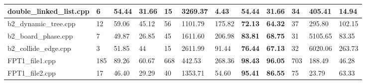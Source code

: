 \begin{table}[h]
{\begin{tabular}{|l|l|lllll|lllll|}
double\_linked\_list.cpp                             & 6                                                   & \multicolumn{1}{l|}{54.44} & \multicolumn{1}{l|}{31.66} & \multicolumn{1}{l|}{15}  & \multicolumn{1}{l|}{3269.37} & 4.43                      & \multicolumn{1}{l|}{\textbf{54.44}} & \multicolumn{1}{l|}{\textbf{31.66}} & \multicolumn{1}{l|}{34}  & \multicolumn{1}{l|}{405.41}  & 14.94                     \\ \hline
b2\_dynamic\_tree.cpp                                & 12                                                  & \multicolumn{1}{l|}{59.06} & \multicolumn{1}{l|}{45.12} & \multicolumn{1}{l|}{56}  & \multicolumn{1}{l|}{1101.79} & 175.82                    & \multicolumn{1}{l|}{\textbf{72.13}} & \multicolumn{1}{l|}{\textbf{64.32}} & \multicolumn{1}{l|}{37}  & \multicolumn{1}{l|}{295.80}  & 102.15                    \\ \hline
b2\_board\_phase.cpp                                 & 7                                                   & \multicolumn{1}{l|}{49.87} & \multicolumn{1}{l|}{26.85} & \multicolumn{1}{l|}{45}  & \multicolumn{1}{l|}{1611.60} & 206.98                    & \multicolumn{1}{l|}{\textbf{83.81}} & \multicolumn{1}{l|}{\textbf{68.75}} & \multicolumn{1}{l|}{31}  & \multicolumn{1}{l|}{5105.65} & 83.35                     \\ \hline
b2\_collide\_edge.cpp                                & 3                                                   & \multicolumn{1}{l|}{51.85} & \multicolumn{1}{l|}{44}    & \multicolumn{1}{l|}{15}  & \multicolumn{1}{l|}{2611.99} & 91.44                     & \multicolumn{1}{l|}{\textbf{76.44}} & \multicolumn{1}{l|}{\textbf{67.13}} & \multicolumn{1}{l|}{32}  & \multicolumn{1}{l|}{6020.06} & 263.73                    \\ \hline
FPT1\_file1.cpp                                    & 185                                                 & \multicolumn{1}{l|}{89.26} & \multicolumn{1}{l|}{60.67} & \multicolumn{1}{l|}{668} & \multicolumn{1}{l|}{442.53}  & 268.36                    & \multicolumn{1}{l|}{\textbf{98.43}} & \multicolumn{1}{l|}{\textbf{96.05}} & \multicolumn{1}{l|}{703} & \multicolumn{1}{l|}{188.49}  & 46.28                     \\ \hline
FPT1\_file2.cpp                               & 17                                                  & \multicolumn{1}{l|}{46.40} & \multicolumn{1}{l|}{29.29} & \multicolumn{1}{l|}{40}  & \multicolumn{1}{l|}{1353.71} & 54.60                     & \multicolumn{1}{l|}{\textbf{95.41}} & \multicolumn{1}{l|}{\textbf{86.55}} & \multicolumn{1}{l|}{75}  & \multicolumn{1}{l|}{23.79}   & 63.33                     \\ \hline

\end{tabular}}
\end{table}
